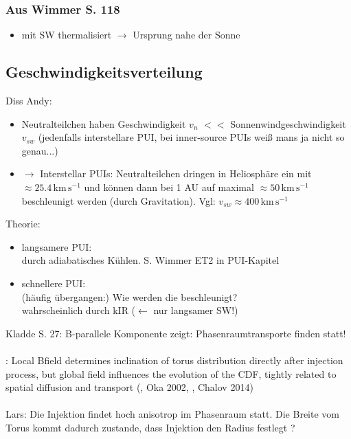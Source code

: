 \documentclass[]{article}
\begin{document}
\subsubsection{Aus Wimmer S. 118}
\begin{itemize}
	\item mit SW thermalisiert $\rightarrow$ Ursprung nahe der Sonne
\end{itemize}
%
%
%
\subsection{Geschwindigkeitsverteilung}
Diss Andy:
\begin{itemize}
	\item Neutralteilchen haben Geschwindigkeit $v_n$ $<<$ Sonnenwindgeschwindigkeit $v_{sw}$ (jedenfalls interstellare PUI, bei inner-source PUIs weiß mans ja nicht so genau...)
	\item $\rightarrow$ Interstellar PUIs: Neutralteilchen dringen in Heliosphäre ein mit $\approx 25.4\,\mathrm{km\,s^{-1}}$ und können dann bei 1 AU auf maximal $\approx 50\,\mathrm{km\,s^{-1}}$ beschleunigt werden (durch Gravitation). Vgl: $v_{sw}\approx 400\,\mathrm{km\,s^{-1}}$
\end{itemize}
Theorie:
\begin{itemize}
	\item langsamere PUI: \\ durch adiabatisches Kühlen. S. Wimmer ET2 in PUI-Kapitel
	\item schnellere PUI: \\
	(häufig übergangen:) Wie werden die beschleunigt?\\
	wahrscheinlich durch kIR ($\leftarrow$ nur langsamer SW!)
\end{itemize}
Kladde S. 27: B-parallele Komponente zeigt: Phasenraumtransporte finden statt!\\ \\
\cite{drews_2015}: Local Bfield determines inclination of torus distribution directly after injection process, but global field influences the evolution of the CDF, tightly related to spatial diffusion and transport (\cite{chalov_1998}, Oka 2002, \cite{drews_2013}, Chalov 2014) \\ \\
Lars: Die Injektion findet hoch anisotrop im Phasenraum statt. Die Breite vom Torus kommt dadurch zustande, dass Injektion den Radius festlegt ? 
%
\end{document}
